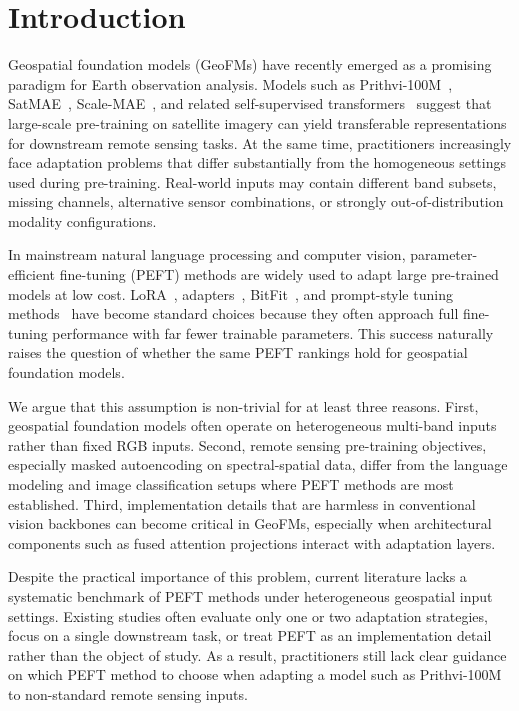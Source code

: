 \documentclass[11pt]{article}
\begin{document}
\section{Introduction}

Geospatial foundation models (GeoFMs) have recently emerged as a promising paradigm for Earth observation analysis. Models such as Prithvi-100M~\cite{jakubik2023prithvi}, SatMAE~\cite{cong2022satmae}, Scale-MAE~\cite{reed2023scalemae}, and related self-supervised transformers~\cite{hong2024spectralgpt} suggest that large-scale pre-training on satellite imagery can yield transferable representations for downstream remote sensing tasks. At the same time, practitioners increasingly face adaptation problems that differ substantially from the homogeneous settings used during pre-training. Real-world inputs may contain different band subsets, missing channels, alternative sensor combinations, or strongly out-of-distribution modality configurations.

In mainstream natural language processing and computer vision, parameter-efficient fine-tuning (PEFT) methods are widely used to adapt large pre-trained models at low cost. LoRA~\cite{hu2022lora}, adapters~\cite{houlsby2019adapter}, BitFit~\cite{zaken2022bitfit}, and prompt-style tuning methods~\cite{lester2021prompt,jia2022vpt} have become standard choices because they often approach full fine-tuning performance with far fewer trainable parameters. This success naturally raises the question of whether the same PEFT rankings hold for geospatial foundation models.

We argue that this assumption is non-trivial for at least three reasons. First, geospatial foundation models often operate on heterogeneous multi-band inputs rather than fixed RGB inputs. Second, remote sensing pre-training objectives, especially masked autoencoding on spectral-spatial data, differ from the language modeling and image classification setups where PEFT methods are most established. Third, implementation details that are harmless in conventional vision backbones can become critical in GeoFMs, especially when architectural components such as fused attention projections interact with adaptation layers.

Despite the practical importance of this problem, current literature lacks a systematic benchmark of PEFT methods under heterogeneous geospatial input settings. Existing studies often evaluate only one or two adaptation strategies, focus on a single downstream task, or treat PEFT as an implementation detail rather than the object of study. As a result, practitioners still lack clear guidance on which PEFT method to choose when adapting a model such as Prithvi-100M to non-standard remote sensing inputs.
\end{document}
